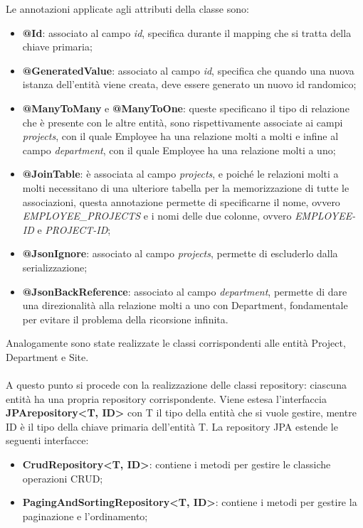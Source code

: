 Le annotazioni applicate agli attributi della classe sono:
\begin{itemize}
  \item \textbf{@Id}: associato al campo \textit{id}, specifica durante il mapping che si tratta della chiave primaria;
  \item \textbf{@GeneratedValue}: associato al campo \textit{id}, specifica che quando una nuova istanza dell'entità viene creata, deve essere generato un nuovo id randomico;
  \item \textbf{@ManyToMany} e \textbf{@ManyToOne}: queste specificano il tipo di relazione che è presente con le altre entità, sono rispettivamente associate ai campi \textit{projects}, con il quale Employee ha una relazione molti a molti e infine al campo \textit{department}, con il quale Employee ha una relazione molti a uno;
  \item \textbf{@JoinTable}: è associata al campo \textit{projects}, e poiché le relazioni molti a molti necessitano di una ulteriore tabella per la memorizzazione di tutte le associazioni, questa annotazione permette di specificarne il nome, ovvero \textit{EMPLOYEE\_PROJECTS} e i nomi delle due colonne, ovvero \textit{EMPLOYEE-ID} e \textit{PROJECT-ID};
  \item \textbf{@JsonIgnore}: associato al campo \textit{projects}, permette di escluderlo dalla serializzazione;
  \item \textbf{@JsonBackReference}: associato al campo \textit{department}, permette di dare una direzionalità alla relazione molti a uno con Department, fondamentale per evitare il problema della ricorsione infinita.
\end{itemize}
Analogamente sono state realizzate le classi corrispondenti alle entità Project, Department e Site.\\\\
A questo punto si procede con la realizzazione delle classi repository: ciascuna entità ha una propria repository corrispondente. Viene estesa l'interfaccia \textbf{JPArepository<T, ID>} con T il tipo della entità che si vuole gestire, mentre ID è il tipo della chiave primaria dell'entità T. La repository JPA estende le seguenti interfacce:
\begin{itemize}
  \item \textbf{CrudRepository<T, ID>}: contiene i metodi per gestire le classiche operazioni CRUD;
  \item \textbf{PagingAndSortingRepository<T, ID>}: contiene i metodi per gestire la paginazione e l'ordinamento;
\end{itemize}
